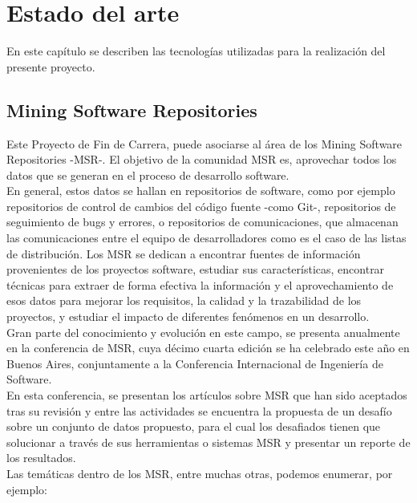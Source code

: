 \cleardoublepage
\chapter{Estado del arte}


En este capítulo se describen las tecnologías utilizadas para la realización del presente proyecto.


\section{Mining Software Repositories}

Este Proyecto de Fin de Carrera, puede asociarse al área de los Mining Software Repositories -MSR-. El objetivo de la comunidad MSR es, aprovechar todos los datos que se generan en el proceso de desarrollo software.\\


En general, estos datos se hallan en repositorios de software, como por ejemplo repositorios de control de cambios del código fuente -como Git-, repositorios de seguimiento de bugs y errores, o repositorios de comunicaciones, que almacenan las comunicaciones entre el equipo de desarrolladores como es el caso de las listas de distribución. Los MSR se dedican a encontrar fuentes de información provenientes de los proyectos software, estudiar sus características, encontrar técnicas para extraer de forma efectiva la información y el aprovechamiento de esos datos para mejorar los requisitos, la calidad y la trazabilidad de los proyectos, y estudiar el impacto de diferentes fenómenos en un desarrollo.\\


Gran parte del conocimiento y evolución en este campo, se presenta anualmente en la conferencia de MSR, cuya décimo cuarta edición se ha celebrado este año en Buenos Aires, conjuntamente a la Conferencia Internacional de Ingeniería de Software.\\


En esta conferencia, se presentan los artículos sobre MSR que han sido aceptados tras su revisión y entre las actividades se encuentra la propuesta de un desafío sobre un conjunto de datos propuesto, para el cual los desafiados tienen que solucionar a través de sus herramientas o sistemas MSR y presentar un reporte de los resultados.\\


Las temáticas dentro de los MSR, entre muchas otras, podemos enumerar, por ejemplo:\\

